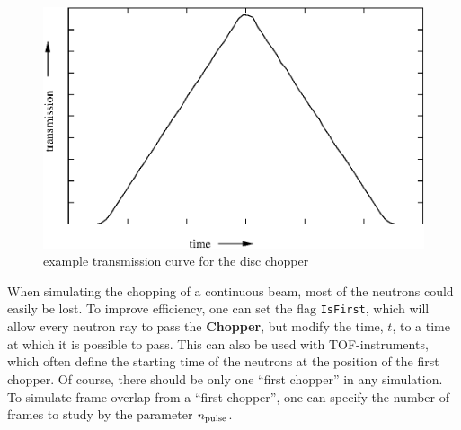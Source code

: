 \begin{figure}[ht]
\includegraphics[width=1.0\linewidth]{figures/tracho.eps}
\caption{example transmission curve for the disc chopper\label{f:chopper2}}
\end{figure}

When simulating the chopping of a continuous beam,
most of the neutrons could easily be lost.
To improve efficiency, one can set the flag \verb+IsFirst+, which will
allow every neutron ray to pass the {\bf Chopper}, but modify the
time, $t$, to a time at which it is possible to pass.
This can also be used with TOF-instruments, which often
define the starting time of the neutrons at
the position of the first chopper.
Of course, there should be only one ``first chopper'' in
any simulation.
To simulate frame overlap from a ``first chopper'', one can specify
the number of frames to study by the parameter $n_{\rm pulse}$.